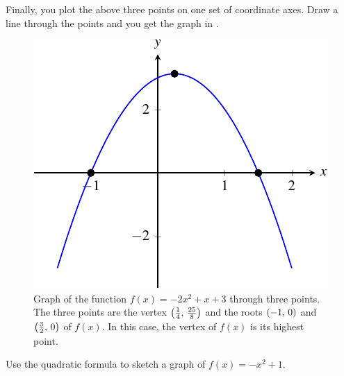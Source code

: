 \documentclass[a4paper,oneside,12pt]{article}
\begin{document}
{\begin{solution}
Finally, you plot the above three points on one set of coordinate
axes.  Draw a line through the points and you get the graph in
.

\begin{figure}[!htbp]
\centering
\includegraphics[scale=1]{image/08/aminus2-b1-c3.pdf}
\caption{%
  Graph of the function $f(x) = -2x^2 + x + 3$ through three points.
  The three points are the vertex $\left\lparen{\frac{1}{4}},\, {\frac{25}{8}}\right\rparen$
  and the roots $\left\lparen{-1},\, {0}\right\rparen$ and $\left\lparen{\frac{3}{2}},\, {0}\right\rparen$ of
  $f(x)$.  In this case, the vertex of $f(x)$ is its highest point.
}
\label{fig:aminus2_b1_c3}
\end{figure}
\end{solution}
}{}

\begin{exercise}
Use the quadratic formula to sketch a graph of $f(x) = -x^2 + 1$.
\end{exercise}
\end{document}
